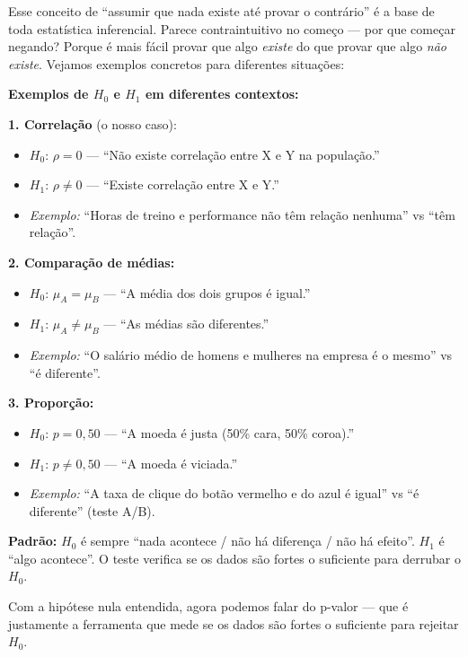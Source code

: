 Esse conceito de ``assumir que nada existe até provar o contrário'' é a
base de toda estatística inferencial.
Parece contraintuitivo no começo — por que começar negando? 
Porque é mais fácil provar que algo \emph{existe} do que provar que algo
\emph{não existe}.
Vejamos exemplos concretos para diferentes situações:

\begin{SolvedBox}
\textbf{Exemplos de $H_0$ e $H_1$ em diferentes contextos:}

\textbf{1. Correlação} (o nosso caso):
\begin{itemize}
  \item $H_0$: $\rho = 0$ — ``Não existe correlação entre X e Y na população.''
  \item $H_1$: $\rho \neq 0$ — ``Existe correlação entre X e Y.''
  \item \textit{Exemplo:} ``Horas de treino e performance não têm relação nenhuma''
  vs ``têm relação''.
\end{itemize}

\textbf{2. Comparação de médias:}
\begin{itemize}
  \item $H_0$: $\mu_A = \mu_B$ — ``A média dos dois grupos é igual.''
  \item $H_1$: $\mu_A \neq \mu_B$ — ``As médias são diferentes.''
  \item \textit{Exemplo:} ``O salário médio de homens e mulheres na empresa
  é o mesmo'' vs ``é diferente''.
\end{itemize}

\textbf{3. Proporção:}
\begin{itemize}
  \item $H_0$: $p = 0{,}50$ — ``A moeda é justa (50\% cara, 50\% coroa).''
  \item $H_1$: $p \neq 0{,}50$ — ``A moeda é viciada.''
  \item \textit{Exemplo:} ``A taxa de clique do botão vermelho e do azul é
  igual'' vs ``é diferente'' (teste A/B).
\end{itemize}

\textbf{Padrão:} $H_0$ é sempre ``nada acontece / não há diferença / não
há efeito''. $H_1$ é ``algo acontece''. O teste verifica se os dados
são fortes o suficiente para derrubar o $H_0$.
\end{SolvedBox}

Com a hipótese nula entendida, agora podemos falar do p-valor — que é
justamente a ferramenta que mede se os dados são fortes o suficiente
para rejeitar $H_0$.

